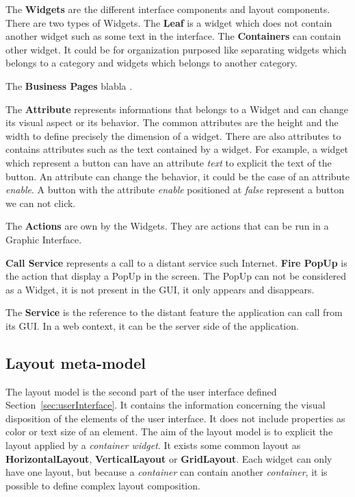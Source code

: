 \documentclass[conference]{IEEEtran}
\begin{document}
The \textbf{Widgets} are the different interface components and layout components.
There are two types of Widgets.
The \textbf{Leaf} is a widget which does not contain another widget such as some text in the interface. 
The \textbf{Containers} can contain other widget. 
It could be for organization purposed like separating widgets which belongs to a category and widgets which belongs to another category.

The \textbf{Business Pages} blabla .

The \textbf{Attribute} represents informations that belongs to a Widget and can change its visual aspect or its behavior.
The common attributes are the height and the width to define precisely the dimension of a widget.
There are also attributes to contains attributes such as the text contained by a widget. 
For example, a widget which represent a button can have an attribute \textit{text} to 
    explicit the text of the button.
An attribute can change the behavior, it could be the case of an attribute \textit{enable}.
A button with the attribute \textit{enable} positioned at \textit{false} represent a button
    we can not click.

The \textbf{Actions} are own by the Widgets.
They are actions that can be run in a Graphic Interface.

\textbf{Call Service} represents a call to a distant service such Internet.
\textbf{Fire PopUp} is the action that display a PopUp in the screen.
The PopUp can not be considered as a Widget, 
    it is not present in the GUI, 
    it only appears and disappears.

The \textbf{Service} is the reference to the distant feature the application can call from its GUI.
In a web context, it can be the server side of the application.

\subsection{Layout meta-model}
\label{sec:layoutModel}


The layout model is the second part of the user interface defined Section~\ref{sec:userInterface}.
It contains the information concerning the visual disposition of the elements of the user interface.
It does not include properties as color or text size of an element.
The aim of the layout model is to explicit the layout applied by a \textit{container widget}.
It exists some common layout as \textbf{HorizontalLayout}, \textbf{VerticalLayout} or \textbf{GridLayout}.
Each widget can only have one layout,
    but because a \textit{container} can contain another \textit{container},
    it is possible to define complex layout composition.
\end{document}
